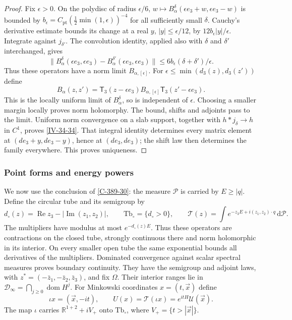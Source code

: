 \documentclass[11pt,letterpaper,reqno]{amsart}
\theoremstyle{definition}
\theoremstyle{remark}
\begin{document}
\begin{proof}
Fix $\epsilon>0$. On the polydisc of radius $\epsilon/6$,
$w\mapsto B_\alpha^\delta(\epsilon e_3+w,\epsilon e_3-w)$
is bounded by
$b_\epsilon=C_{\mathrm{pt}}(\frac12\min(1,\epsilon))^{-4}$
for all sufficiently small $\delta$.
Cauchy's derivative estimate bounds its change at a real
$y$, $|y|\le\epsilon/12$, by $12b_\epsilon|y|/\epsilon$.
Integrate against $j_{\delta'}$. The convolution identity,
applied also with $\delta$ and $\delta'$ interchanged, gives
\[
 \|B_\alpha^\delta(\epsilon e_3,\epsilon e_3)
       -B_\alpha^{\delta'}(\epsilon e_3,\epsilon e_3)\|
       \le6b_\epsilon(\delta+\delta')/\epsilon.
\]
Thus these operators have a norm limit $B_{\alpha,[\epsilon]}$.
For $\epsilon\le\min(d_3(z),d_3(z'))$ define
\[
 B_\alpha(z,z')=
 \mathsf T_3(z-\epsilon e_3)B_{\alpha,[\epsilon]}
                              \mathsf T_3(z'-\epsilon e_3).
\]
This is the locally uniform limit of $B_\alpha^\delta$, so is
independent of $\epsilon$. Choosing a smaller margin locally
proves norm holomorphy. The bound, shifts and adjoints pass to
the limit. Uniform norm convergence on a slab support, together
with $h*j_\delta\to h$ in $C^1$, proves \eqref{IV-34-34}.
That integral identity determines every matrix element at
$(de_3+y,de_3-y)$, hence at $(de_3,de_3)$; the shift law
then determines the family everywhere. This proves uniqueness.
\end{proof}

\subsubsection{Point forms and energy powers}

We now use the conclusion of \cref{C-389-30}: the measure
$\mathcal P$ is carried by $E\ge|q|$.
Define the circular tube and its semigroup by
\begin{equation}\label{IV-75-5}
 d_\circ(z)=\operatorname{Re}z_3-|\operatorname{Im}(z_1,z_2)|,
 \qquad \mathrm{Tb}_\circ=\{d_\circ>0\},\qquad
 \mathcal T(z)=\int e^{-z_3E+i(z_1,z_2)\cdot q}\,\mathrm{d}\mathcal P.
\end{equation}
The multipliers have modulus at most $e^{-d_\circ(z)E}$.
Thus these operators are contractions on the closed tube,
strongly continuous there and norm holomorphic in its interior.
On every smaller open tube the same exponential bounds all
derivatives of the multipliers. Dominated convergence against
scalar spectral measures proves boundary continuity.
They have the semigroup and adjoint laws, with
$z^*=(-\bar z_1,-\bar z_2,\bar z_3)$, and fix $\Omega$.
Their interior ranges lie in
$\mathcal D_\infty=\bigcap_{j\ge0}\operatorname{dom}H^j$.
For Minkowski coordinates $x=(t,\vec x)$ define
\begin{equation}\label{IV-75-8}
 \iota x=(\vec x,-it),\qquad
 U(x)=\mathcal T(\iota x)=e^{itH}\mathcal U(\vec x).
\end{equation}
The map $\iota$ carries $\mathbb R^{1+2}+iV_+$ onto
$\mathrm{Tb}_\circ$, where $V_+=\{t>|\vec x|\}$.
\end{document}
